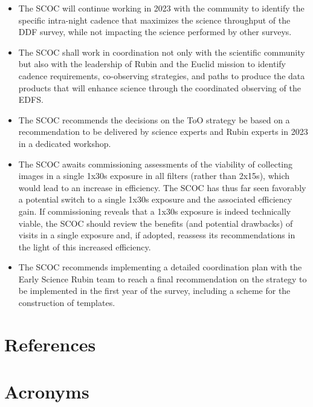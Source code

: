 \documentclass[PST,authoryear,toc]{lsstdoc}
\begin{document}
\begin{itemize}
\item {The SCOC will continue working in 2023 with the community to identify the specific intra-night cadence that maximizes the science throughput of the DDF survey, while not impacting the science performed by other surveys.} 

\item{The SCOC shall work in coordination not only with the scientific community but also with the leadership of Rubin and the Euclid mission to identify cadence requirements, co-observing strategies, and paths to produce the data products that will enhance science through the coordinated observing of the EDFS.}

\item The SCOC recommends the decisions on the ToO strategy be based on a recommendation to be delivered by science experts and Rubin experts in  2023 in a dedicated workshop.

\item The SCOC awaits commissioning assessments of the viability of collecting images in a single 1x30s exposure in all filters (rather than 2x15s), which would lead to an increase in efficiency. The SCOC has thus far seen favorably a potential switch to a single 1x30s exposure and the associated efficiency gain. If commissioning reveals that a 1x30s exposure is indeed technically viable, the SCOC should review the benefits (and potential drawbacks) of visits in a single exposure and, if adopted, reassess its recommendations in the light of this increased efficiency.


\item The SCOC recommends implementing a detailed coordination plan with the Early Science Rubin team to reach a final recommendation on the strategy to be implemented in the first year of the survey, including a scheme for the construction of templates.


\end{itemize}



\appendix
\section{References} \label{sec:bib}
\renewcommand{\refname}{} %


\section{Acronyms} \label{sec:acronyms}

\end{document}
